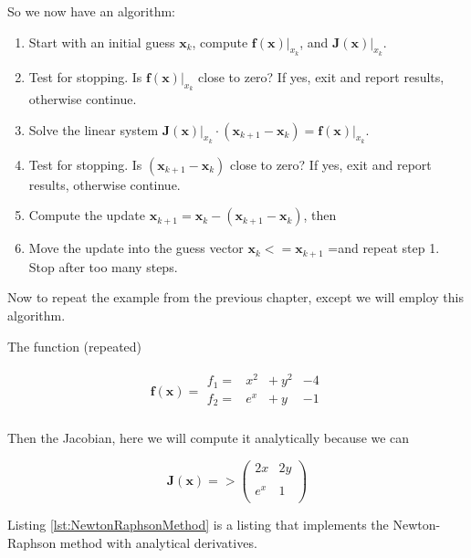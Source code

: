 So we now have an algorithm:
\begin{enumerate}
\item Start with an initial guess $\mathbf{x}_{k}$, compute $\mathbf{f(x)}\rvert_{x_k}$, and $\mathbf{J(x)}\rvert_{x_k}$.
\item Test for stopping.  Is $\mathbf{f(x)}\rvert_{x_k}$ close to zero?  If yes, exit and report results, otherwise continue.
\item Solve the linear system $\mathbf{J(x)}\rvert_{x_k} \cdot (\mathbf{x}_{k+1}-\mathbf{x}_{k}) = \mathbf{f(x)}\rvert_{x_k}$.
\item Test for stopping.  Is $ (\mathbf{x}_{k+1}-\mathbf{x}_{k})$ close to zero?  If yes, exit and report results, otherwise continue.
\item Compute the update $\mathbf{x}_{k+1} = \mathbf{x}_{k} - (\mathbf{x}_{k+1}-\mathbf{x}_{k}) $, then
\item Move the update into the guess vector $\mathbf{x}_{k} <=\mathbf{x}_{k+1}$ =and repeat step 1.   Stop after too many steps.
\end{enumerate}

Now to repeat the example from the previous chapter, except we will employ this algorithm.

The function (repeated)

\begin{gather}
\mathbf{f(x)} = 
\begin{matrix}
f_1 = & x^2 & +~y^2 & - 4\\
f_2 = & e^x & +~y  & - 1\\
\end{matrix}
\end{gather}

Then the Jacobian, here we will compute it analytically because we can

\begin{equation}
\mathbf{J(x)}=>
{\begin{pmatrix}
2x & 2y \\
~ & ~ \\
e^x & 1 \\
\end{pmatrix}}
\label{eqn:JacobianExample}
\end{equation}

Listing \ref{lst:NewtonRaphsonMethod} is a listing that implements the Newton-Raphson method with analytical derivatives.

